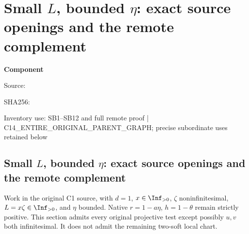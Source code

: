 \chapter{Small $L$, bounded $\eta$: exact source openings and the remote complement}
\label{component:p6d2f659c0fde}
\noindent\textbf{Component }\par
{\small\noindent Source: \par}
{\small\noindent SHA256: \par}
{\small\noindent Inventory use: SB1--SB12 and full remote proof | C14\_\allowbreak{}ENTIRE\_\allowbreak{}ORIGINAL\_\allowbreak{}PARENT\_\allowbreak{}GRAPH; precise subordinate uses retained below\par}
\medskip
\section[Small L, bounded eta: source openings and the remote complement]{Small $L$, bounded $\eta$: exact source openings and the remote complement}
\label{p6d2f659c0fde:sec:r8-c1-small-L-bounded-eta}

Work in the original C1 source, with $d=1$, $x\in\Inf_{>0}$,
$\zeta$ noninfinitesimal, $L=x\zeta\in\Inf_{>0}$, and $\eta$
bounded. Native $r=1-a\eta$, $h=1-\theta$ remain strictly positive.
This section admits every original projective test except possibly
$u,v$ both infinitesimal. It does not admit the remaining two-soft
local chart.

